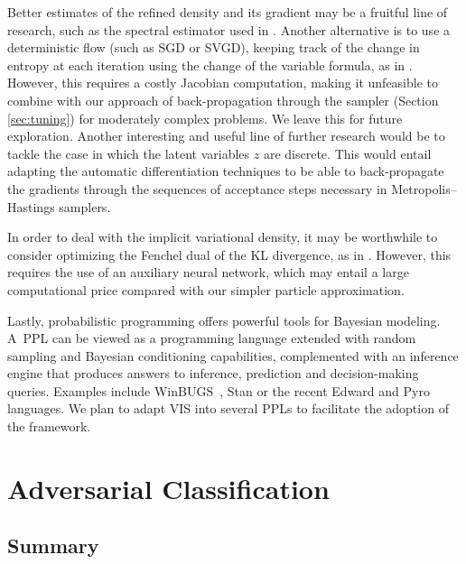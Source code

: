 Better estimates of the refined density and its gradient may be a fruitful line of research, such as the spectral estimator used in \parencite{shi2018spectral}. Another alternative is to use a deterministic flow (such as SGD or SVGD), keeping
track of the change in entropy at each iteration using the change of the variable formula, as in \parencite{duvenaud2016early}. However, this requires a costly Jacobian computation, making it unfeasible to combine with our approach of back-propagation through the sampler (Section \ref{sec:tuning}) for moderately complex problems. We leave this for future exploration. {Another interesting and useful line of further research would be to tackle the case in which the latent variables $z$ are discrete. This would entail adapting the automatic differentiation techniques to be able to back-propagate the gradients through the sequences of acceptance steps necessary in Metropolis--Hastings samplers.}

In order to deal with the implicit variational density, it may be worthwhile to consider optimizing the Fenchel dual of the KL divergence, as
 in \parencite{fang2019implicit}. However, this requires the use of an auxiliary neural network, which may entail a large computational price compared with our simpler particle approximation.

Lastly, probabilistic programming offers powerful tools for Bayesian modeling.
A~PPL can be viewed as a programming language extended with random sampling and Bayesian conditioning capabilities, complemented with an inference engine that produces answers to inference, prediction and decision-making queries. Examples 
include WinBUGS~\parencite{lunn2000winbugs}, Stan \parencite{carpenter2017stan} or the recent Edward \parencite{tran2018simple} and Pyro \parencite{bingham2018pyro} languages. We plan to adapt VIS into several PPLs to facilitate the adoption of the framework.


\section{Adversarial Classification}

\subsection{Summary}

